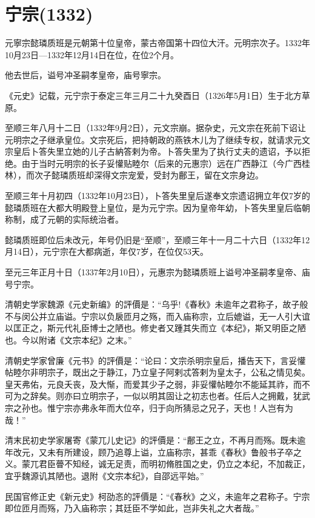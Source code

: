 
\section{宁宗\tiny(1332)}

元寧宗懿璘质班是元朝第十位皇帝，蒙古帝国第十四位大汗。元明宗次子。1332年10月23日—1332年12月14日在位，在位2个月。

他去世后，谥号冲圣嗣孝皇帝，庙号寧宗。

《元史》记载，元宁宗于泰定三年三月二十九癸酉日（1326年5月1日）生于北方草原。

至顺三年八月十二日（1332年9月2日），元文宗崩。据杂史，元文宗在死前下诏让元明宗之子继承皇位。文宗死后，把持朝政的燕铁木儿为了继续专权，就请求元文宗皇后卜答失里立她的儿子古納答剌为帝。卜答失里为了执行丈夫的遗诏，予以拒绝。由于当时元明宗的长子妥懽贴睦尔（后来的元惠宗）远在广西静江（今广西桂林），而次子懿璘质班却深得文宗宠爱，受封为鄜王，留在文宗身边。

至顺三年十月初四（1332年10月23日），卜答失里皇后遂奉文宗遗诏拥立年仅7岁的懿璘质班在大都大明殿登上皇位，是为元宁宗。因为皇帝年幼，卜答失里皇后临朝称制，成了元朝的实际统治者。

懿璘质班即位后未改元，年号仍旧是“至顺”，至顺三年十一月二十六日（1332年12月14日），元宁宗在大都病逝，年仅7岁，在位仅53天。

至元三年正月十日（1337年2月10日），元惠宗为懿璘质班上谥号冲圣嗣孝皇帝、庙号宁宗。

清朝史学家魏源《元史新编》的評價是：“乌乎!《春秋》未逾年之君称子，故子般不与闵公并立庙谥。宁宗以负扆匝月之殇，而入庙称宗，立后媲谥，无一人引大谊以匡正之，斯元代礼臣博士之陋也。修史者又踵其失而立《本纪》，斯又明臣之陋也。今以附诸《文宗本纪》之末。”

清朝史学家曾廉《元书》的評價是：“论曰：文宗杀明宗皇后，播告天下，言妥懽帖睦尔非明宗子，既出之于静江，乃立皇子阿剌忒答剌为皇太子，公私之情见矣。皇天弗佑，元良夭丧，及大惭，而爱其少子之弱，非妥懽帖睦尔不能延其祚，而不可为之辞矣。则亦曰立明宗子，一似以明其固让之初志也者。任后人之拥戴，犹武宗之孙也。惟宁宗亦弗永年而大位卒，归于向所猜忌之兄子，天也！人岂有为哉！”

清末民初史学家屠寄《蒙兀儿史记》的評價是：“鄜王之立，不再月而殇。既未逾年改元，又未有所建设，顾乃追尊上谥，立庙称宗，甚乖《春秋》鲁般书子卒之义。蒙兀君臣瞢不知经，诚无足责，而明初脩胜国之史，仍立之本纪，不加裁正，宜乎魏源讥其陋也。退附《文宗本纪》，自邵远平始。”

民国官修正史《新元史》柯劭忞的評價是：“《春秋》之义，未逾年之君称子。宁宗即位匝月而殇，乃入庙称宗；其廷臣不学如此，岂非失礼之大者哉。” 

